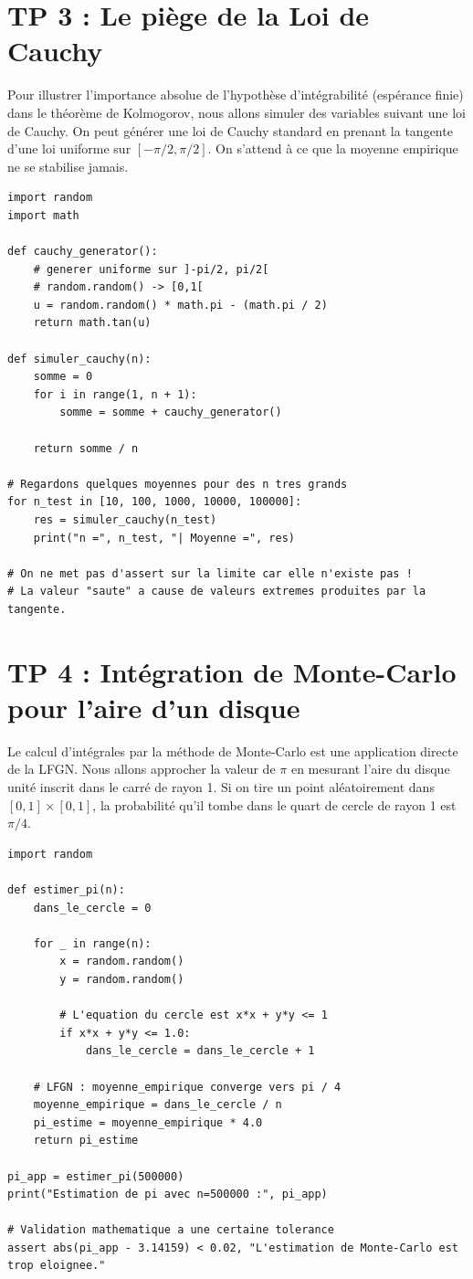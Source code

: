 \documentclass[11pt,a4paper]{article}
\begin{document}
\section*{TP 3 : Le piège de la Loi de Cauchy}

Pour illustrer l'importance absolue de l'hypothèse d'intégrabilité (espérance finie) dans le théorème de Kolmogorov, nous allons simuler des variables suivant une loi de Cauchy.
On peut générer une loi de Cauchy standard en prenant la tangente d'une loi uniforme sur $[-\pi/2, \pi/2]$.
On s'attend à ce que la moyenne empirique ne se stabilise jamais.

\begin{lstlisting}
import random
import math

def cauchy_generator():
    # generer uniforme sur ]-pi/2, pi/2[
    # random.random() -> [0,1[
    u = random.random() * math.pi - (math.pi / 2)
    return math.tan(u)

def simuler_cauchy(n):
    somme = 0
    for i in range(1, n + 1):
        somme = somme + cauchy_generator()

    return somme / n

# Regardons quelques moyennes pour des n tres grands
for n_test in [10, 100, 1000, 10000, 100000]:
    res = simuler_cauchy(n_test)
    print("n =", n_test, "| Moyenne =", res)

# On ne met pas d'assert sur la limite car elle n'existe pas !
# La valeur "saute" a cause de valeurs extremes produites par la tangente.
\end{lstlisting}


\section*{TP 4 : Intégration de Monte-Carlo pour l'aire d'un disque}

Le calcul d'intégrales par la méthode de Monte-Carlo est une application directe de la LFGN.
Nous allons approcher la valeur de $\pi$ en mesurant l'aire du disque unité inscrit dans le carré de rayon 1.
Si on tire un point aléatoirement dans $[0, 1] \times [0, 1]$, la probabilité qu'il tombe dans le quart de cercle de rayon 1 est $\pi / 4$.

\begin{lstlisting}
import random

def estimer_pi(n):
    dans_le_cercle = 0

    for _ in range(n):
        x = random.random()
        y = random.random()

        # L'equation du cercle est x*x + y*y <= 1
        if x*x + y*y <= 1.0:
            dans_le_cercle = dans_le_cercle + 1

    # LFGN : moyenne_empirique converge vers pi / 4
    moyenne_empirique = dans_le_cercle / n
    pi_estime = moyenne_empirique * 4.0
    return pi_estime

pi_app = estimer_pi(500000)
print("Estimation de pi avec n=500000 :", pi_app)

# Validation mathematique a une certaine tolerance
assert abs(pi_app - 3.14159) < 0.02, "L'estimation de Monte-Carlo est trop eloignee."
\end{lstlisting}
\end{document}
